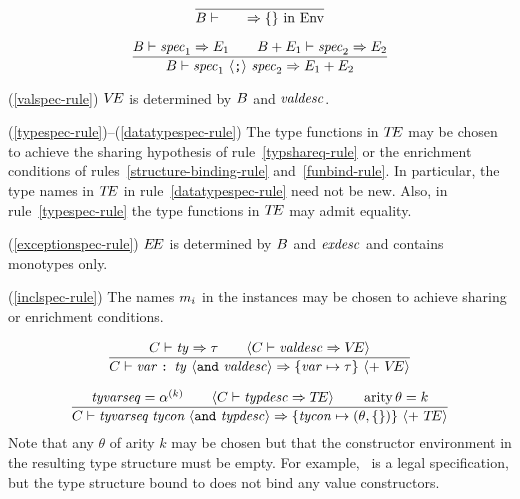 \begin{equation}        %
\frac{}
     { \B\ts\emptyspec\ra\emptymap{\rm\ in}\ \Env }
\end{equation}

\begin{equation}        %
\frac{ \B\ts\spec_1\ra\E_1 \qquad \plusmap{\B}{\E_1}\ts\spec_2\ra\E_2 }
     { \B\ts\seqspec\ra\plusmap{\E_1}{\E_2} }
\end{equation}
\comments
\begin{description}
\item{(\ref{valspec-rule})}
   $\mbox{$V\!E$}$ is determined by $B$ and ${\it valdesc}$.
\item{(\ref{typespec-rule})--(\ref{datatypespec-rule})}
   The type functions in $\mbox{$T\!E$}$ may be chosen to achieve the sharing hypothesis
of rule~\ref{typshareq-rule} or the enrichment conditions of 
rules~\ref{structure-binding-rule} and~\ref{funbind-rule}. In particular, the type
names in $\mbox{$T\!E$}$ in rule~\ref{datatypespec-rule} need not be new.
Also, in rule~\ref{typespec-rule} the type functions in $\mbox{$T\!E$}$ may admit
equality.
%
\item{(\ref{exceptionspec-rule})}
   $\mbox{$E\!E$}$ is determined by $B$ and ${\it exdesc}$ and contains monotypes only.
\item{(\ref{inclspec-rule})}
   The names $m_i$ in the instances may be chosen to achieve sharing or
enrichment conditions.
\end{description} 

\begin{equation}         %
\frac{ \C\ts\ty\ra\tau\qquad
       \langle\C\ts\valdesc\ra\VE\rangle }
     { \C\ts\valdescription\ra\{\var\mapsto\tau\}
       \ \langle +\ \VE\rangle }\index{43.1}
\end{equation}

\begin{equation}         %
\label{typdesc-rule}
\frac{ \tyvarseq = \alphak
       \qquad\langle \C\ts\typdesc\ra\TE\rangle\qquad\arity\theta=k }
     { \C\ts\typdescription\ra\{\tycon\mapsto(\theta,\emptymap)\}
       \ \langle +\ \TE\rangle }\index{43.2}
\end{equation}
\comment Note that any $\theta$ of arity $k$ may be chosen but that
the constructor environment in the resulting type structure must be
empty. For example, \mbox{}\  
is a legal specification, but the type structure bound to 
does not bind any value constructors.

